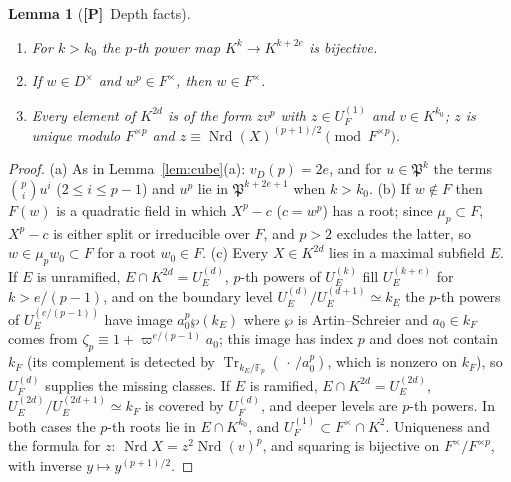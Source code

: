 \documentclass[11pt]{article}
\newcommand{\Fq}{\mathbb F}
\newcommand{\Nrd}{\operatorname{Nrd}}
\newcommand{\Tr}{\operatorname{Tr}}
\newcommand{\Pfr}{\mathfrak P}
\newcommand{\Ptag}{\textnormal{\textbf{[P]}}}
\theoremstyle{plain}
\newtheorem{lemma}[theorem]{Lemma}
\theoremstyle{definition}
\begin{document}
\begin{lemma}[\Ptag\ Depth facts]\label{lem:depth-gen}
\begin{enumerate}[label=(\alph*)]
\item For $k>k_0$ the $p$-th power map $K^k\to K^{k+2e}$ is bijective.
\item If $w\in D^\times$ and $w^p\in F^\times$, then $w\in F^\times$.
\item Every element of $K^{2d}$ is of the form $zv^p$ with
$z\in U_F^{(1)}$ and $v\in K^{k_0}$; $z$ is unique modulo $F^{\times p}$
and $z\equiv\Nrd(X)^{(p+1)/2}\pmod{F^{\times p}}$.
\end{enumerate}
\end{lemma}
\begin{proof}
(a) As in Lemma~\ref{lem:cube}(a): $v_D(p)=2e$, and for $u\in\Pfr^k$ the
terms $\binom pi u^i$ ($2\le i\le p-1$) and $u^p$ lie in $\Pfr^{k+2e+1}$
when $k>k_0$.  (b) If $w\notin F$ then $F(w)$ is a quadratic field in
which $X^p-c$ ($c=w^p$) has a root; since $\mu_p\subset F$, $X^p-c$ is
either split or irreducible over $F$, and $p>2$ excludes the latter, so
$w\in\mu_pw_0\subset F$ for a root $w_0\in F$.  (c) Every $X\in K^{2d}$
lies in a maximal subfield $E$.  If $E$ is unramified, $E\cap K^{2d}=U^{(d)}_E$,
$p$-th powers of $U^{(k)}_E$ fill $U^{(k+e)}_E$ for $k>e/(p-1)$, and on
the boundary level $U^{(d)}_E/U^{(d+1)}_E\simeq k_E$ the $p$-th powers of
$U^{(e/(p-1))}_E$ have image $a_0^p\wp(k_E)$ where $\wp$ is
Artin--Schreier and $a_0\in k_F$ comes from $\zeta_p\equiv1+\varpi^{e/(p-1)}a_0$;
this image has index $p$ and does not contain $k_F$ (its complement is
detected by $\Tr_{k_E/\Fq_p}(\,\cdot\,/a_0^p)$, which is nonzero on
$k_F$), so $U_F^{(d)}$ supplies the missing classes.  If $E$ is ramified,
$E\cap K^{2d}=U_E^{(2d)}$, $U_E^{(2d)}/U_E^{(2d+1)}\simeq k_F$ is covered
by $U_F^{(d)}$, and deeper levels are $p$-th powers.  In both cases the
$p$-th roots lie in $E\cap K^{k_0}$, and $U_F^{(1)}\subset F^\times\cap K^2$.
Uniqueness and the formula for $z$: $\Nrd X=z^2\Nrd(v)^p$, and squaring
is bijective on $F^\times/F^{\times p}$, with inverse $y\mapsto y^{(p+1)/2}$.
\end{proof}
\end{document}
